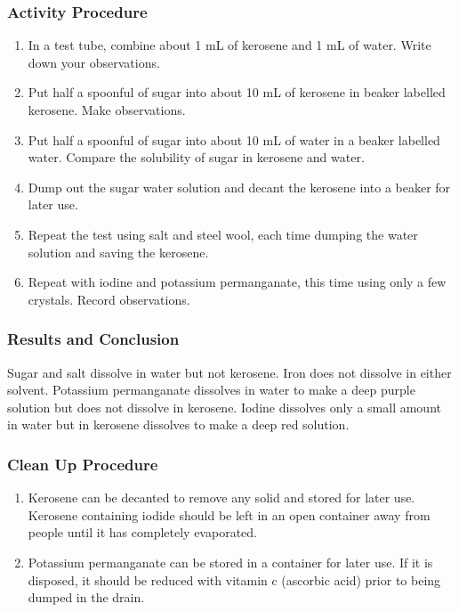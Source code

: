\subsubsection*{Activity Procedure}
\begin{enumerate}
\item{In a test tube, combine about 1 mL of kerosene and 1 mL of water. Write down your observations.}
\item{Put half a spoonful of sugar into about 10 mL of kerosene in beaker labelled kerosene. Make observations.}
\item{Put half a spoonful of sugar into about 10 mL of water in a beaker labelled water. Compare the solubility of sugar in kerosene and water.}
\item{Dump out the sugar water solution and decant the kerosene into a beaker for later use.}
\item{Repeat the test using salt and steel wool, each time dumping the water solution and saving the kerosene.}
\item{Repeat with iodine and potassium permanganate, this time using only a few crystals. Record observations.}
\end{enumerate}

\subsubsection*{Results and Conclusion}
Sugar and salt dissolve in water but not kerosene. Iron does not dissolve in either solvent. Potassium permanganate dissolves in water to make a deep purple solution but does not dissolve in kerosene. Iodine dissolves only a small amount in water but in kerosene dissolves to make a deep red solution.

\subsubsection*{Clean Up Procedure}
\begin{enumerate}
\item{Kerosene can be decanted to remove any solid and stored for later use. Kerosene containing iodide should be left in an open container away from people until it has completely evaporated.}
\item{Potassium permanganate can be stored in a container for later use. If it is disposed, it should be reduced with vitamin c (ascorbic acid) prior to being dumped in the drain.}
\end{enumerate}

